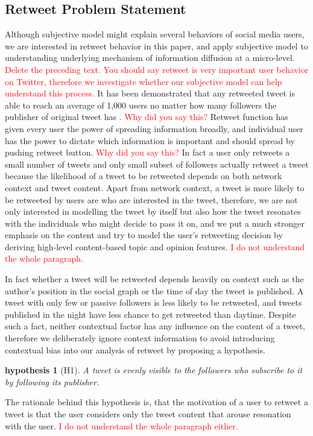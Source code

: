 \documentclass{acm_proc_article-sp}
\newtheorem{hypothesis}{hypothesis}
\newcommand{\mo}[1]{\textcolor{red}{#1}}
\begin{document}
\subsection{Retweet Problem Statement}
\label{statement}
Although subjective model might explain several behaviors of social media users, we are interested in retweet behavior in this paper, and apply subjective model to understanding underlying mechanism of information diffusion at a micro-level. \mo{Delete the preceding text. You should say retweet is very important user behavior on Twitter, therefore we investigate whether our subjective model can help understand this process.} 
It has been demonstrated that any retweeted tweet is able to reach an average of 1,000 users no matter how many followers the publisher of original tweet has \cite{Kwak:2010TSN}. \mo{Why did you say this?} 
Retweet function has given every user the power of spreading information broadly, and individual user has the power to dictate which information is important and should spread by pushing retweet button. \mo{Why did you say this?} 
In fact a user only retweets a small number of tweets and only small subset of followers actually retweet a tweet because the likelihood of a tweet to be retweeted depends on both network context and tweet content. 
Apart from network context, a tweet is more likely to be retweeted by users are who are interested in the tweet, therefore, we are not only interested in modelling the tweet by itself but also how the tweet resonates with the individuals who might decide to pass it on, and we put a much stronger emphasis on the content and try to model the user's retweeting decision by deriving high-level content-based topic and opinion features. \mo{I do not understand the whole paragraph.} 

In fact whether a tweet will be retweeted depends heavily on context such as the author's position in the social graph or the time of day the tweet is published. 
A tweet with only few or passive followers is less likely to be retweeted, and tweets published in the night have less chance to get retweeted than daytime. 
Despite such a fact, neither contextual factor has any influence on the content of a tweet, therefore we deliberately ignore context information to avoid introducing contextual bias into our analysis of retweet by proposing a hypothesis. 
\begin{hypothesis}[H1]
\label{hypothesis1}
A tweet is evenly visible to the followers who subscribe to it by following its publisher.
\end{hypothesis}
The rationale behind this hypothesis is, that the motivation of a user to retweet a tweet is that the user considers only the tweet content that arouse resonation with the user. \mo{I do not understand the whole paragraph either.} 
\end{document}
